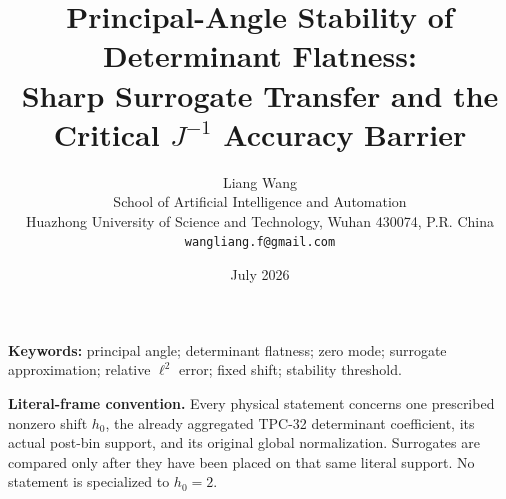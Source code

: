 \documentclass[11pt]{article}
\title{\textbf{Principal-Angle Stability of Determinant Flatness:}\\
Sharp Surrogate Transfer and the Critical \(J^{-1}\)
Accuracy Barrier}
\author{Liang Wang\\
School of Artificial Intelligence and Automation\\
Huazhong University of Science and Technology, Wuhan 430074, P.R. China\\
\texttt{wangliang.f@gmail.com}}
\date{July 2026}
\theoremstyle{definition}
\theoremstyle{remark}
\begin{document}
\maketitle



\noindent\textbf{Keywords:}
principal angle; determinant flatness; zero mode; surrogate
approximation; relative \(\ell^2\) error; fixed shift; stability
threshold.

\medskip
\noindent\textbf{Literal-frame convention.}
Every physical statement concerns one prescribed nonzero shift
\(h_0\), the already aggregated TPC-32 determinant coefficient, its
actual post-bin support, and its original global normalization.
Surrogates are compared only after they have been placed on that
same literal support.  No statement is specialized to \(h_0=2\).









\begingroup
\footnotesize
\raggedright


\endgroup
\end{document}
